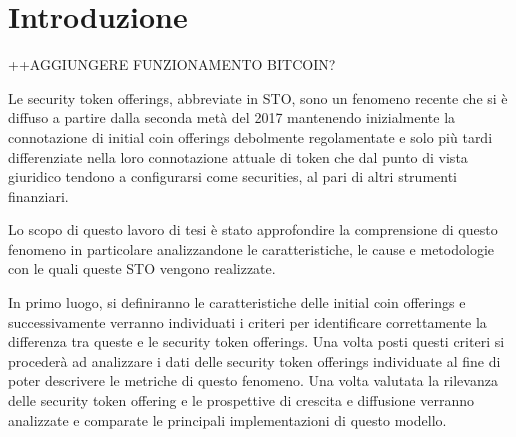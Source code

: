 \chapter*{Introduzione}                 %

++AGGIUNGERE FUNZIONAMENTO BITCOIN?

Le security token offerings, abbreviate in STO, sono un fenomeno recente che si è diffuso a partire dalla seconda metà del 2017 mantenendo inizialmente la connotazione di initial coin offerings debolmente regolamentate e solo più tardi differenziate nella loro connotazione attuale di token che dal punto di vista giuridico tendono a configurarsi come securities, al pari di altri strumenti finanziari.  

Lo scopo di questo lavoro di tesi è stato approfondire la comprensione di questo fenomeno in particolare analizzandone le caratteristiche, le cause e metodologie con le quali queste STO vengono realizzate.

In primo luogo, si definiranno le caratteristiche delle initial coin offerings e successivamente verranno individuati i criteri per identificare correttamente la differenza tra queste e le security token offerings. Una volta posti questi criteri si procederà ad analizzare i dati delle security token offerings individuate al fine di poter descrivere le metriche di questo fenomeno. Una volta valutata la rilevanza delle security token offering e le prospettive di crescita e diffusione verranno analizzate e comparate le principali implementazioni di questo modello.  



\clearpage{\pagestyle{empty}\cleardoublepage}